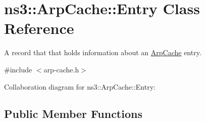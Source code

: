 \hypertarget{classns3_1_1ArpCache_1_1Entry}{}\section{ns3\+:\+:Arp\+Cache\+:\+:Entry Class Reference}
\label{classns3_1_1ArpCache_1_1Entry}


A record that that holds information about an \hyperlink{classns3_1_1ArpCache}{Arp\+Cache} entry.  




{\ttfamily \#include $<$arp-\/cache.\+h$>$}



Collaboration diagram for ns3\+:\+:Arp\+Cache\+:\+:Entry\+:
\subsection*{Public Member Functions}
